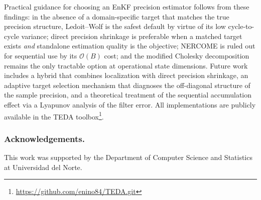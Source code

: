 Practical guidance for choosing an EnKF precision estimator follows from these findings: in the absence of a domain-specific target that matches the true precision structure, Ledoit--Wolf is the safest default by virtue of its low cycle-to-cycle variance; direct precision shrinkage is preferable when a matched target exists \emph{and} standalone estimation quality is the objective; NERCOME is ruled out for sequential use by its $\mathcal{O}(B)$ cost; and the modified Cholesky decomposition remains the only tractable option at operational state dimensions. Future work includes a hybrid that combines localization with direct precision shrinkage, an adaptive target selection mechanism that diagnoses the off-diagonal structure of the sample precision, and a theoretical treatment of the sequential accumulation effect via a Lyapunov analysis of the filter error. All implementations are publicly available in the TEDA toolbox\footnote{\url{https://github.com/enino84/TEDA.git}}.

\subsubsection{Acknowledgements.} This work was supported by the Department of Computer Science and Statistics at Universidad del Norte.
